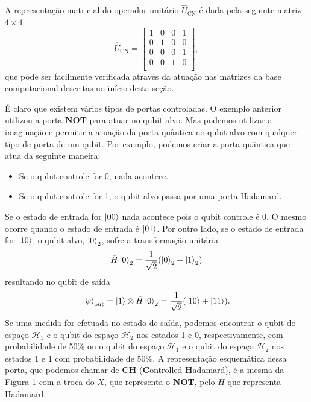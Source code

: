 \documentclass{article}
\begin{document}
A representação matricial do operador unitário $\hat{U}_\text{CN}$ é dada pela seguinte matriz $4\times 4$:
\begin{equation}
    \hat{U}_{\text{CN}} = \begin{bmatrix}
    1 & 0 & 0 & 1\\
    0 & 1 & 0 & 0\\
    0 & 0 & 0 & 1\\
    0 & 0 & 1 & 0\\
    \end{bmatrix},
\end{equation}
que pode ser facilmente verificada através da atuação nas matrizes da base computacional descritas no início desta seção.

É claro que existem vários tipos de portas controladas. O exemplo anterior utilizou a porta \textbf{NOT} para atuar no qubit alvo. Mas podemos utilizar a imaginação e permitir a atuação da porta quântica no qubit alvo com qualquer tipo de porta de um qubit. Por exemplo, podemos criar a porta quântica que atua da seguinte maneira:
\begin{itemize}
    \item Se o qubit controle for 0, nada acontece.
    \item Se o qubit controle for 1, o qubit alvo passa por uma porta Hadamard.
\end{itemize}
Se o estado de entrada for $\ket{00}$ nada acontece pois o qubit controle é 0. O mesmo ocorre quando o estado de entrada é $\ket{01}$. Por outro lado, se o estado de entrada for $\ket{10}$, o qubit alvo, $\ket{0}_2$, sofre a transformação unitária
\begin{equation}
    \hat{H}\ket{0}_2 = \frac{1}{\sqrt{2}}(\ket{0}_2 + \ket{1}_2)
\end{equation}
resultando no qubit de saída
\begin{equation}
    \ket{\psi}_\text{out} = \ket{1}\otimes \hat{H}\ket{0}_2 = \frac{1}{\sqrt{2}}(\ket{10} + \ket{11}).
\end{equation}
Se uma medida for efetuada no estado de saída, podemos encontrar o qubit do espaço $\mathcal{H}_1$ e o qubit do espaço $\mathcal{H}_2$ nos estados 1 e 0, respectivamente, com probabilidade de 50\% ou o qubit do espaço $\mathcal{H}_1$ e o qubit do espaço $\mathcal{H}_2$ nos estados 1 e 1 com probabilidade de 50\%. A representação esquemática dessa porta, que podemos chamar de \textbf{CH} (\textbf{C}ontrolled-\textbf{H}adamard), é a mesma da Figura 1 com a troca do $X$, que representa o \textbf{NOT}, pelo $H$ que representa Hadamard.
\end{document}
